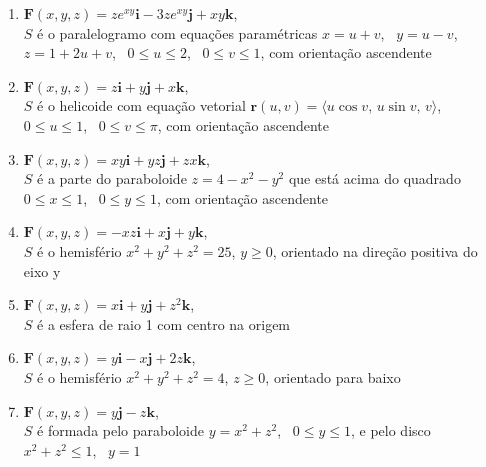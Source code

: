\documentclass[a4paper, 12pt]{article}
\begin{document}
	\begin{enumerate}[resume]

		\item $\textbf{F}(x,y,z) = ze^{xy}\textbf{i} - 3ze^{xy}\textbf{j} + xy\textbf{k}$, \\ $S$ é o paralelogramo com equações paramétricas $x = u + v$, \, $y = u - v$, \, $z = 1 + 2u + v$, \, $0 \leq u \leq 2$, \, $0 \leq v \leq 1$, com orientação ascendente

		\item $\textbf{F}(x,y,z) = z\textbf{i} + y\textbf{j} + x\textbf{k}$, \\ $S$ é o helicoide com equação vetorial $\textbf{r}(u,v) = \langle u \cos v, \, u \sin v, \, v \rangle$, \, $0 \leq u \leq 1$, \, $0 \leq v \leq \pi$, com orientação ascendente
		\resposta{$\pi$}

		\item $\textbf{F}(x,y,z) = xy\textbf{i} + yz\textbf{j} + zx\textbf{k}$, \\ $S$ é a parte do paraboloide $z = 4 - x^2 - y^2$ que está acima do quadrado $0 \leq x \leq 1$, \, $0 \leq y \leq 1$, com orientação ascendente

		\item $\textbf{F}(x,y,z) = -xz\textbf{i} + x\textbf{j} + y\textbf{k}$, \\ $S$ é o hemisfério $x^2 + y^2 + z^2 = 25$, $y \geq 0$, orientado na direção positiva do eixo y \\
		\resposta{\fazer}

		\item $\textbf{F}(x,y,z) = x\textbf{i} + y\textbf{j} + z^{2}\textbf{k}$, \\ $S$ é a esfera de raio 1 com centro na origem
		\resposta{\fazer}

		\item $\textbf{F}(x,y,z) = y\textbf{i} - x\textbf{j} + 2z\textbf{k}$, \\ $S$ é o hemisfério $x^2 + y^2 + z^2 = 4$, $z \geq 0$, orientado para baixo

		\item $\textbf{F}(x,y,z) = y\textbf{j} - z\textbf{k}$, \\ $S$ é formada pelo paraboloide $y = x^2 + z^2$, \, $0 \leq y \leq 1$, e pelo disco $x^2 + z^2 \leq 1$, \, $y = 1$\\


\end{enumerate}
\end{document}

